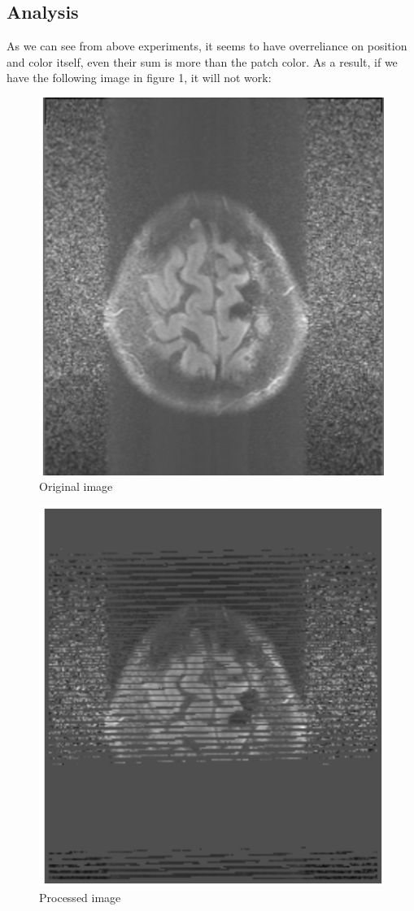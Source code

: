 \documentclass[conference]{IEEEtran}
\begin{document}
\subsection{Analysis}
As we can see from above experiments, it seems to have overreliance on position and color itself, even their sum is more than the patch color. As a result, if we have the following image in figure 1, it will not work:
\begin{figure}[h!]
\caption{Original image}
\includegraphics[scale = 0.34]{Snipaste_2018-05-28_14-39-56.png} 
\centering 
\end{figure}
\begin{figure}[h!]
\centering 
\caption{Processed image}
\includegraphics[scale = 0.34]{Snipaste_2018-05-28_14-40-00.png}
\end{figure}
\end{document}
